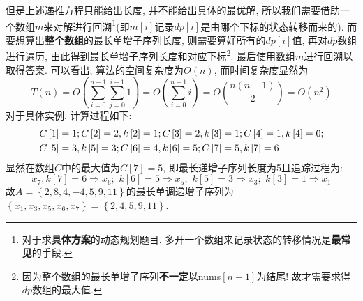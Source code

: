 \documentclass{article}
\begin{document}
\begin{homeworkProblem}
    但是上述递推方程只能给出长度, 并不能给出具体的最优解, 所以我们需要借助一个数组$m$来对解进行回溯\footnote{对于求\textbf{具体方案}的动态规划题目, 多开一个数组来记录状态的转移情况是\textbf{最常见}的手段.}(即$m[i]$记录$dp[i]$是由哪个下标的状态转移而来的). 而要想算出\textbf{整个数组}的最长单增子序列长度, 则需要算好所有的$dp[i]$值, 再对$dp$数组进行遍历, 由此得到最长单增子序列长度和对应下标\footnote{因为整个数组的最长单增子序列\textbf{不一定}以nums$[n-1]$为结尾! 故才需要求得$dp$数组的最大值.}. 最后使用数组$m$进行回溯以取得答案. 可以看出, 算法的空间复杂度为$O(n)$, 而时间复杂度显然为$$T\left( n \right) =O\left( \sum_{i=0}^{n-1}{\sum_{j=0}^{i-1}{1}} \right) =O\left( \sum_{i=0}^{n-1}{i} \right) =O\left( \frac{n\left( n-1 \right)}{2} \right) =O\left( n^2 \right) 
	$$
	对于具体实例, 计算过程如下:
	\begin{align}
		&C\left[ 1 \right] =1; C\left[ 2 \right] =2,k\left[ 2 \right] =1; C\left[ 3 \right] =2,k\left[ 3 \right] =1; C\left[ 4 \right] =1,k\left[ 4 \right] =0; \notag
		\\
		&C\left[ 5 \right] =3, k\left[ 5 \right] =3; C\left[ 6 \right] =4,k\left[ 6 \right] =5; C\left[ 7 \right] =5,k\left[ 7 \right] =6 \notag
	\end{align}
	显然在数组$C$中的最大值为$C[7]=5$, 即最长递增子序列长度为5且追踪过程为: $$x_7,k\left[ 7 \right] =6\Rightarrow x_6;\,\, k\left[ 6 \right] =5\Rightarrow x_5;\,\, k\left[ 5 \right] =3\Rightarrow x_3;\,\, k\left[ 3 \right] =1\Rightarrow x_1
	$$
	故$A=\left\{ 2,8,4,-4,5,9,11 \right\} $的最长单调递增子序列为$\left\{ x_1,x_3,x_5,x_6,x_7 \right\} =\left\{ 2,4,5,9,11 \right\}$.


\end{homeworkProblem}
\end{document}
